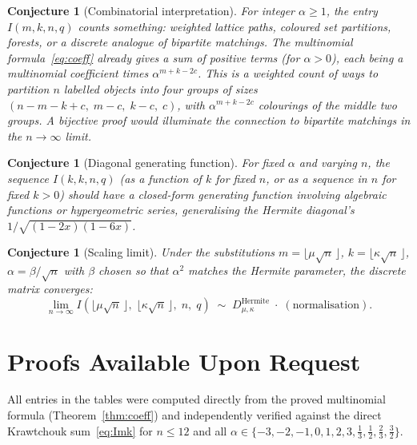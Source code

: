 \documentclass[11pt,a4paper]{article}
\theoremstyle{plain}
\newtheorem{conjecture}[theorem]{Conjecture}
\theoremstyle{definition}
\begin{document}
\begin{tcolorbox}[colback=blue!5, colframe=blue!5, boxrule=0pt,
  sharp corners]
\begin{conjecture}[Combinatorial interpretation]\label{conj:comb}
For integer $\alpha \ge 1$, the entry $I(m, k, n, q)$ counts
something: weighted lattice paths, coloured set partitions,
forests, or a discrete analogue of bipartite matchings. The
multinomial formula~\eqref{eq:coeff} already gives a sum of
positive terms (for $\alpha > 0$), each being a multinomial
coefficient times $\alpha^{m+k-2c}$. This is a weighted count of
ways to partition $n$ labelled objects into four groups of sizes
$(n{-}m{-}k{+}c,\; m{-}c,\; k{-}c,\; c)$, with
$\alpha^{m+k-2c}$ colourings of the middle two groups. A bijective
proof would illuminate the connection to bipartite matchings in the
$n \to \infty$ limit.
\end{conjecture}
\end{tcolorbox}

\begin{tcolorbox}[colback=blue!5, colframe=blue!5, boxrule=0pt,
  sharp corners]
\begin{conjecture}[Diagonal generating function]\label{conj:diag-gf}
For fixed $\alpha$ and varying $n$, the sequence
$I(k, k, n, q)$ (as a function of $k$ for fixed $n$, or as a
sequence in $n$ for fixed $k > 0$) should have a closed-form
generating function involving algebraic functions or hypergeometric
series, generalising the Hermite diagonal's
$1/\sqrt{(1{-}2x)(1{-}6x)}$.
\end{conjecture}
\end{tcolorbox}

\begin{tcolorbox}[colback=blue!5, colframe=blue!5, boxrule=0pt,
  sharp corners]
\begin{conjecture}[Scaling limit]\label{conj:limit}
Under the substitutions $m = \lfloor \mu\sqrt{n}\, \rfloor$,
$k = \lfloor \kappa\sqrt{n}\, \rfloor$,
$\alpha = \beta/\sqrt{n}$ with $\beta$ chosen so that $\alpha^2$
matches the Hermite parameter, the discrete matrix converges:
\[
  \lim_{n \to \infty} I\!\left(\lfloor\mu\sqrt{n}\,\rfloor,\;
  \lfloor\kappa\sqrt{n}\,\rfloor,\; n,\; q\right)
  \;\sim\; D_{\mu,\kappa}^{\text{Hermite}}\;
  \cdot\; (\text{normalisation}).
\]
\end{conjecture}
\end{tcolorbox}

\section{Proofs Available Upon Request}

All entries in the tables were computed directly from the proved
multinomial formula (Theorem~\ref{thm:coeff}) and independently
verified against the direct Krawtchouk sum~\eqref{eq:Imk} for
$n \le 12$ and all $\alpha \in \{-3, -2, -1, 0, 1, 2, 3,
\tfrac13, \tfrac12, \tfrac23, \tfrac32\}$.
\end{document}

